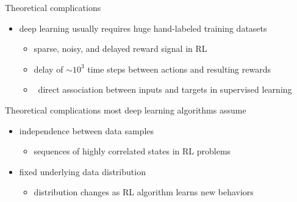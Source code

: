 \begin{frame}{Theoretical complications}
    \begin{itemize}\itemsep=12pt

        \item deep learning usually requires huge hand-labeled training datasets
        \vspace*{0.5em}
        \begin{itemize}
            \item sparse, noisy, and delayed reward signal in RL
            \item delay of $\sim10^{3}$ time steps between actions and resulting rewards
            \item \cf\ direct association between inputs and targets in supervised learning
        \end{itemize}

    \end{itemize}
\end{frame}

\begin{frame}{Theoretical complications}
    most deep learning algorithms assume
    \vspace*{0.5em}
    \begin{itemize}\itemsep=12pt

        \item independence between data samples
        \vspace*{0.5em}
        \begin{itemize}
            \item sequences of highly correlated states in RL problems
        \end{itemize}

        \item fixed underlying data distribution
        \vspace*{0.5em}
        \begin{itemize}
            \item distribution changes as RL algorithm learns new behaviors
        \end{itemize}

    \end{itemize}
\end{frame}

